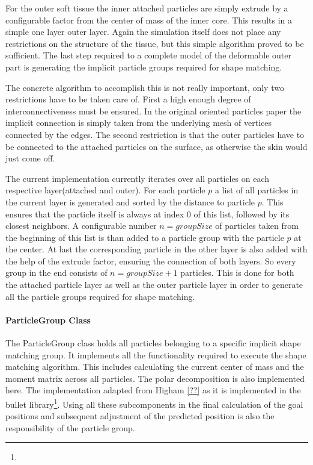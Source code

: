 For the outer soft tissue the inner attached particles are simply extrude by a configurable factor from the center of mass of the inner core. This results in a simple one layer outer layer. Again the simulation itself does not place any restrictions on the structure of the tissue, but this simple algorithm proved to be sufficient. The last step required to a complete model of the deformable outer part is generating the implicit particle groups required for shape matching.

The concrete algorithm to accomplish this is not really important, only two restrictions have to be taken care of. First a high enough degree of interconnectiveness must be ensured. In the original oriented particles paper the implicit connection is simply taken from the underlying mesh of vertices connected by the edges. The second restriction is that the outer particles have to be connected to the attached particles on the surface, as otherwise the skin would just come off.

The current implementation currently iterates over all particles on each respective layer(attached and outer). For each particle $p$ a list of all particles in the current layer is generated and sorted by the distance to particle $p$. This ensures that the particle itself is always at index $0$ of this list, followed by its closest neighbors. A configurable number $n = groupSize$ of particles taken from the beginning of this list is than added to a particle group with the particle $p$ at the center. At last the corresponding particle in the other layer is also added with the help of the extrude factor, ensuring the connection of both layers. So every group in the end consists of $n = groupSize + 1$ particles. This is done for both the attached particle layer as well as the outer particle layer in order to generate all the particle groups required for shape matching.

\paragraph{ParticleGroup Class}
The ParticleGroup class holds all particles belonging to a specific implicit shape matching group. It implements all the functionality required to execute the shape matching algorithm. This includes calculating the current center of mass and the moment matrix across all particles. The polar decomposition is also implemented here. The implementation adapted from Higham \ref{??} as it is implemented in the bullet library\footnote{}. Using all these subcomponents in the final calculation of the goal positions and subsequent adjustment of the predicted position is also the responsibility of the particle group.

